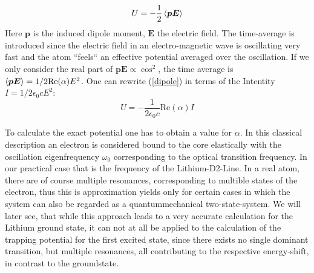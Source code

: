 \begin{equation}
U=-\frac{1}{2}\left\langle \boldsymbol{p E}\right\rangle
\label{dipole}
\end{equation} 
Here $\boldsymbol{p}$ is the induced dipole moment, $\boldsymbol{E}$ the electric field. The time-average is introduced since the electric field in an electro-magnetic wave is oscillating very fast and the atom “feels“ an effective potential averaged over the oscillation. If we only consider the real part of $\boldsymbol{p}\boldsymbol{E}\propto \cos^2$, the time average is $\left\langle \boldsymbol{p}\boldsymbol{E}\right\rangle=1/2 \mathrm{ Re}(\alpha)E^2$. One can rewrite (\ref{dipole}) in terms of the Intentity $I=1/2\epsilon_0cE^2 $:
\begin{equation}
U=-\frac{1}{2\epsilon_0 c}\mathrm{Re}(\alpha)I
\end{equation} 

To calculate the exact potential one has to obtain a value for $\alpha$. In this classical description an electron is considered bound to the core elastically with the oscillation eigenfrequency $\omega_0$ corresponding to the optical transition frequency. In our practical case that is the frequency of the Lithium-D2-Line. In a real atom, there are of course multiple resonances, corresponding to multible states of the electron, thus this is approximation yields only for certain cases in which the system can also be regarded as a quantummechanical two-state-system. We will later see, that while this approach leads to a very accurate calculation for the Lithium ground state, it can not at all be applied to the calculation of the trapping potential for the first excited state, since there exists no single dominant transition, but multiple resonances, all contributing to the respective energy-shift, in contrast to the groundstate.

